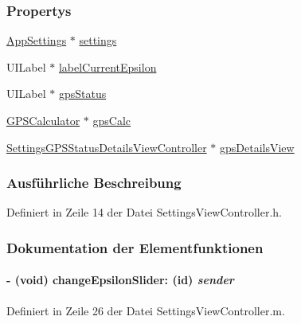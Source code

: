 \subsubsection*{Propertys}
\begin{DoxyCompactItemize}
\item 
\hyperlink{interface_app_settings}{AppSettings} $\ast$ \hyperlink{interface_settings_view_controller_a82f5d348bd9f9f3217da55f84dcc94b1}{settings}
\item 
UILabel $\ast$ \hyperlink{interface_settings_view_controller_a593ba4073eefd191613782f2eba8aebd}{labelCurrentEpsilon}
\item 
UILabel $\ast$ \hyperlink{interface_settings_view_controller_ae0b5b73b9a84ed76b93e76ed7c8f56e3}{gpsStatus}
\item 
\hyperlink{interface_g_p_s_calculator}{GPSCalculator} $\ast$ \hyperlink{interface_settings_view_controller_a949fc1f1af89aa0e25d5c141bc70bd97}{gpsCalc}
\item 
\hyperlink{interface_settings_g_p_s_status_details_view_controller}{SettingsGPSStatusDetailsViewController} $\ast$ \hyperlink{interface_settings_view_controller_a2fee453249f10e0ebe7c4912960d60ec}{gpsDetailsView}
\end{DoxyCompactItemize}


\subsubsection{Ausführliche Beschreibung}


Definiert in Zeile 14 der Datei SettingsViewController.h.

\subsubsection{Dokumentation der Elementfunktionen}
\hypertarget{interface_settings_view_controller_a1666ba6a7424d34f67afbcd5be605efc}{
\paragraph[{changeEpsilonSlider:}]{\setlength{\rightskip}{0pt plus 5cm}-\/ (void) changeEpsilonSlider: (id) {\em sender}}\hfill}
\label{interface_settings_view_controller_a1666ba6a7424d34f67afbcd5be605efc}


Definiert in Zeile 26 der Datei SettingsViewController.m.

